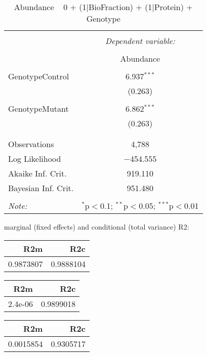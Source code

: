 \documentclass[11pt]{report}
\begin{document}
\begin{table}[!htbp] \centering 
  \caption{Abundance ~ 0 + (1|BioFraction) + (1|Protein) + Genotype} 
  \label{} 
\begin{tabular}{@{\extracolsep{5pt}}lc} 
\\[-1.8ex]\hline 
\hline \\[-1.8ex] 
 & \multicolumn{1}{c}{\textit{Dependent variable:}} \\ 
\cline{2-2} 
\\[-1.8ex] & Abundance \\ 
\hline \\[-1.8ex] 
 GenotypeControl & 6.937$^{***}$ \\ 
  & (0.263) \\ 
  & \\ 
 GenotypeMutant & 6.862$^{***}$ \\ 
  & (0.263) \\ 
  & \\ 
\hline \\[-1.8ex] 
Observations & 4,788 \\ 
Log Likelihood & $-$454.555 \\ 
Akaike Inf. Crit. & 919.110 \\ 
Bayesian Inf. Crit. & 951.480 \\ 
\hline 
\hline \\[-1.8ex] 
\textit{Note:}  & \multicolumn{1}{r}{$^{*}$p$<$0.1; $^{**}$p$<$0.05; $^{***}$p$<$0.01} \\ 
\end{tabular} 
\end{table} 
marginal (fixed effects) and conditional (total variance) R2:

\begin{tabular}{r|r}
\hline
R2m & R2c\\
\hline
0.9873807 & 0.9888104\\
\hline
\end{tabular}

\begin{tabular}{r|r}
\hline
R2m & R2c\\
\hline
2.4e-06 & 0.9899018\\
\hline
\end{tabular}

\begin{tabular}{r|r}
\hline
R2m & R2c\\
\hline
0.0015854 & 0.9305717\\
\hline
\end{tabular}
\end{document}
